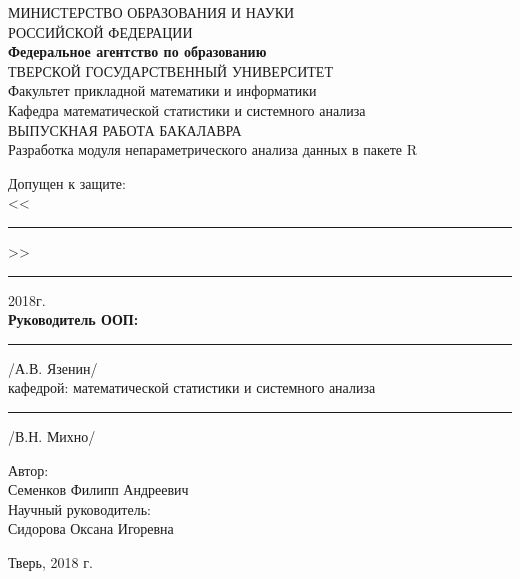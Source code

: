 \documentclass[14pt,a4paper]{scrartcl}
\begin{document}
    \begin{titlepage}
        \begin{center}
            \large
            МИНИСТЕРСТВО ОБРАЗОВАНИЯ И НАУКИ\\
            РОССИЙСКОЙ ФЕДЕРАЦИИ\\
            \textbf{Федеральное агентство по образованию\\}
            \vspace{0.5cm}
            ТВЕРСКОЙ ГОСУДАРСТВЕННЫЙ УНИВЕРСИТЕТ\\
            \vspace{0.25cm}
            Факультет прикладной математики и информатики\\
            Кафедра математической статистики и системного анализа\\
            \vfill
            \textsc{ВЫПУСКНАЯ РАБОТА БАКАЛАВРА}\\[5mm]
            {\LARGE Разработка модуля непараметрического анализа данных в пакете R\\[2mm]}
            \bigskip
        \end{center}
        \vfill
        \hfill
        \begin{minipage}{0.4\textwidth}
			Допущен к защите:\\
			<<\rule{0.12\textwidth}{0.4pt}>>\rule{0.45\textwidth}{0.4pt}2018г.\\
			{\bf Руководитель ООП:}\\

			\rule{0.50\textwidth}{0.4pt}{/А.В. Язенин/}\\
			{  кафедрой:} {математической статистики и системного анализа}\\

			\rule{0.50\textwidth}{0.4pt}{/В.Н. Михно/}
		\end{minipage}
		\hfill
		\begin{minipage}{0.4\textwidth}
			\begin{flushleft}
		        Автор:\\
		        Семенков Филипп Андреевич\\

		        Научный руководитель:\\
		        Сидорова Оксана Игоревна\\
			\end{flushleft}
        \end{minipage}
        \vfill
        \begin{center}
            Тверь, 2018 г.
        \end{center}
    \end{titlepage}
\end{document}
